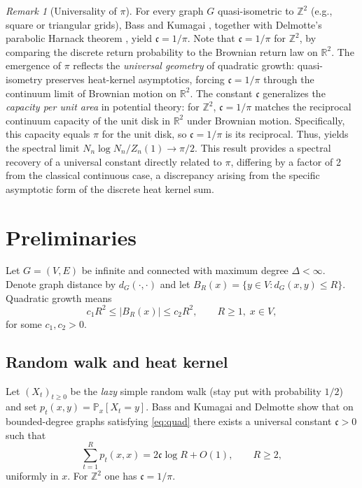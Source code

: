 \documentclass[11pt]{amsart}
\theoremstyle{remark}
\newtheorem{remark}[theorem]{Remark}
\newcommand{\cG}{\mathfrak{c}}      %
\begin{document}
\begin{remark}[Universality of $\pi$]\label{rem:pi2}
For every graph $G$ quasi-isometric to $\mathbb Z^{2}$ (e.g., square or triangular grids), 
Bass and Kumagai \cite{BassKumagai08}, together with Delmotte's parabolic Harnack theorem 
\cite{Delmotte99}, yield $\cG=1/\pi$. 
Note that $\cG = 1/\pi$ for $\mathbb{Z}^2$, by comparing the discrete return probability to the Brownian return law on $\mathbb{R}^2$. 
The emergence of $\pi$ reflects the \emph{universal geometry} of 
quadratic growth: quasi-isometry preserves heat-kernel asymptotics, forcing $\cG=1/\pi$ 
through the continuum limit of Brownian motion on $\mathbb{R}^2$. 
The constant $\cG$ generalizes the \emph{capacity per unit area} in potential theory: 
for $\mathbb{Z}^2$, $\cG = 1/\pi$ matches the reciprocal continuum capacity of the unit disk in $\mathbb{R}^2$ under Brownian motion. Specifically, this capacity equals $\pi$ for the unit disk, so $\cG = 1/\pi$ is its reciprocal.
Thus,  
yields the spectral limit $N_n\log N_n/Z_n(1)\to\pi/2$. This result provides a spectral recovery of a universal constant directly related to $\pi$, differing by a factor of 2 from the classical continuous case, a discrepancy arising from the specific asymptotic form of the discrete heat kernel sum.
\end{remark}

 

\section{Preliminaries}

Let $G=(V,E)$ be infinite and connected with maximum degree
$\Delta<\infty$. Denote graph distance by $d_G(\cdot,\cdot)$ and let
$B_R(x)=\{y\in V:d_G(x,y)\le R\}$.
Quadratic growth means
\begin{equation}\label{eq:quad}
  c_1R^{2}\le |B_R(x)|\le c_2R^{2},\qquad R\ge1,\;x\in V,
\end{equation}
for some $c_1,c_2>0$.

\subsection{Random walk and heat kernel}
Let $(X_t)_{t\ge0}$ be the \emph{lazy} simple random walk
(stay put with probability $1/2$) and set
$p_t(x,y)=\mathbb{P}_x[X_t=y]$.
Bass and Kumagai \cite{BassKumagai08} and Delmotte \cite{Delmotte99}
show that on bounded-degree graphs satisfying \eqref{eq:quad}
there exists a universal constant $\cG>0$ such that
\begin{equation}\label{eq:return-sum}
  \sum_{t=1}^{R} p_t(x,x)=2\cG\log R+O(1),\qquad R\ge2,
\end{equation}
uniformly in $x$. For $\mathbb Z^{2}$ one has $\cG=1/\pi$.
\end{document}
